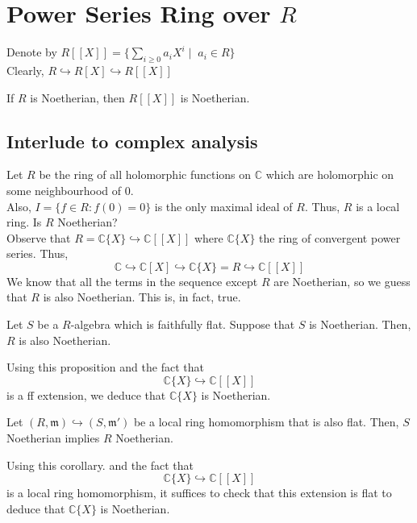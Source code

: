 \documentclass[oneside, 12pt]{scrbook}
\newcommand{\CC}{\mathbb C}
\newcommand{\m}{\mathfrak{m}}
\theoremstyle{theorem}
\begin{document}
\section{Power Series Ring over $R$}

Denote by $R[[ X ]] = \{\sum_{i \geq 0} a_{i}X^i \mid \; a_{i} \in R\}$ \\

Clearly, $R \hookrightarrow R[X] \hookrightarrow R[[ X ]]$

\begin{theorem}
If $R$ is Noetherian, then $R [[ X ]] $ is Noetherian.
\end{theorem}


\subsection{Interlude to complex analysis}

Let $R$ be the ring of all holomorphic functions on $\CC$ which are holomorphic on some neighbourhood of $0$. \\

Also, $I = \{f \in R : f(0)=0\}$ is the only maximal ideal of $R$. Thus, $R$ is a local ring. Is $R$ Noetherian? \\

Observe that $R = \CC \{ X \} \hookrightarrow \CC [[ X ]]$ where $\CC \{ X \}$ the ring of convergent power series. Thus, $$\CC \hookrightarrow \CC[X] \hookrightarrow \CC \{ X \}=R \hookrightarrow \CC [[ X ]]$$
We know that all the terms in the sequence except $R$ are Noetherian, so we guess that $R$ is also Noetherian. This is, in fact, true. 

\begin{proposition}
Let $S$ be a $R$-algebra which is faithfully flat. Suppose that $S$ is Noetherian. Then, $R$ is also Noetherian.
\end{proposition}

Using this proposition and the fact that $$\CC\{X\} \hookrightarrow \CC [[ X ]]$$ is a ff extension, we deduce that $\CC \{X\}$ is Noetherian.

\begin{corollary}
Let $(R, \m) \hookrightarrow (S, \m')$ be a local ring homomorphism that is also flat. Then, $S$ Noetherian implies $R$ Noetherian.
\end{corollary}

Using this corollary. and the fact that $$\CC \{X\} \hookrightarrow \CC [[ X ]]$$
is a local ring homomorphism, it suffices to check that this extension is flat to deduce that $\CC\{X\}$ is Noetherian.
\end{document}
